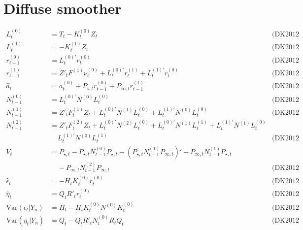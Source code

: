 \documentclass{article}
\begin{document}
\section{Diffuse smoother}
\begin{align*}
  L^{(0)}_t &= T_t - K^{(0)}_tZ_t & \mbox{(DK2012 5.12)}\\
  L^{(1)}_t &= - K^{(1)}_tZ_t & \mbox{(DK2012 5.12)}\\
  r^{(0)}_{t-1} &= L^{(0)'}_tr^{(0)}_t & \mbox{(DK2012 5.21)}\\
  r^{(1)}_{t-1} &= Z'_tF^{(1)}\nu^{(0)}_t + L^{(0)'}_tr^{(1)}_t +
                  L^{(1)'}_tr^{(0)}_t & \mbox{(DK2012 5.21)}\\
    \hat a_t &= a^{(0)}_t + P_{\star,t}r^{(0)}_{t-1}  +
             P_{\infty,t}r^{(1)}_{t-1} & \mbox{(DK2012 5.23)} \\
  N^{(0)}_{t-1} &= L^{(0)'}_tN^{(0)}L^{(0)}_t & \mbox{(DK2012 5.26)}\\
  N^{(1)}_{t-1} &= Z'_tF^{(1)}_tZ_t + L^{(0)'}_tN^{(1)}L^{(0)}_t
                  +L^{(1)'}_tN^{(0)}L^{(0)}_t
                  & \mbox{(DK2012 5.29)}\\
  N^{(2)}_{t-1} &= Z'_tF^{(2)}_tZ_t + L^{(0)'}_tN^{(2)}L^{(0)}_t +
                  L^{(0)'}_tN^{(1)}L^{(1)}_t +
                  L^{(1)'}_tN^{(1)}L^{(0)}_t \\
  &\;\;\;\;  L^{(1)'}_tN^{(0)}L^{(1)}_t & \mbox{(DK2012 5.29)}\\
  V_t &= P_{\star,t} - P_{\star,t}N^{(0)}_{t-1}P_{\star,t} -
        (P_{\star,t}N^{(1)}_{t-1}P_{\infty,t})' -
        P_{\infty,t}N^{(1)}_{t-1}P_{\star,t}\\
  &\;\;\;\;-P_{\infty,t}N^{(2)}_{t-1}P_{\infty,t} & \mbox{(DK2012
                                                    5.28)}\\
  \hat\epsilon_t &= -H_tK^{(0)}_tr^{(0)}_t & \mbox{(DK2012 p.135)}\\
  \hat\eta_t &= Q_tR'_tr^{(0)}_t& \mbox{(DK2012 p.135)}\\
  \mbox{Var}(\epsilon_t|Y_n) &= H_t - H_tK^{(0)}_tN^{(0)}K^{(0)}_t &
                                                                     \mbox{(DK2012
                                                                     p.135)}\\
  \mbox{Var}(\eta_t|Y_n) &= Q_t - Q_tR'_tN^{(0)}_tR_tQ_t &
                                                           \mbox{(DK2012
                                                           p.135)}\\
\end{align*}
\end{document}
